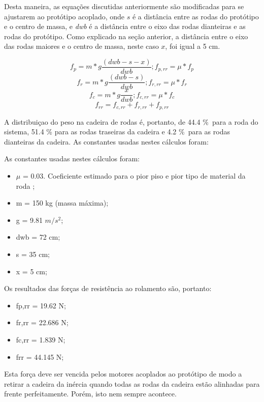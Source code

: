 Desta maneira, as equações discutidas anteriormente são modificadas para se ajustarem ao protótipo acoplado, onde $s$ é a distância entre as rodas do protótipo e o centro de massa, e \textit{dwb} é a distância entre o eixo das rodas dianteiras e as rodas do protótipo. Como explicado na seção anterior, a distância entre o eixo das rodas maiores e o centro de massa, neste caso $x$, foi igual a 5 cm.

\begin{equation}
	f_p=m*g\frac{(dwb-s-x)}{dwb} ; f_{p,rr}=\mu*f_p
\end{equation}
\begin{equation}
	f_r=m*g\frac{(dwb-s)}{dwb} ; f_{r,rr}=\mu*f_r
\end{equation}
\begin{equation}
	f_c=m*g\frac{x}{dwb} ; f_{c,rr}=\mu*f_c
\end{equation}
\begin{equation}
	f_{rr}=f_{c,rr}+f_{r,rr}+f_{p,rr}
\end{equation}

A distribuiçao do peso na cadeira de rodas é, portanto, de 44.4 \%\ para a roda do sistema, 51.4 \% para as rodas traseiras da cadeira e 4.2 \%\ para as rodas dianteiras da cadeira. As constantes usadas nestes cálculos foram:

As constantes usadas nestes cálculos foram:


\begin{itemize}
	\item $\mu$ = 0.03. Coeficiente estimado para o pior piso e pior tipo de material da roda \cite{rolling_resistance};
	\item m = 150 kg (massa máxima);
	\item g = 9.81 $m/s^2$;
	\item dwb = 72 cm;
	\item s = 35 cm;
	\item x = 5 cm;
\end{itemize}

Os resultados das forças de resistência ao rolamento são, portanto:

\begin{itemize}
	\item fp,rr = 19.62 N;
	\item fr,rr = 22.686 N;
	\item fc,rr = 1.839 N;
	\item frr = 44.145 N;
\end{itemize}

Esta força deve ser vencida pelos motores acoplados ao protótipo de modo a retirar a cadeira da inércia quando todas as rodas da cadeira estão alinhadas para frente perfeitamente. Porém, isto nem sempre acontece.

